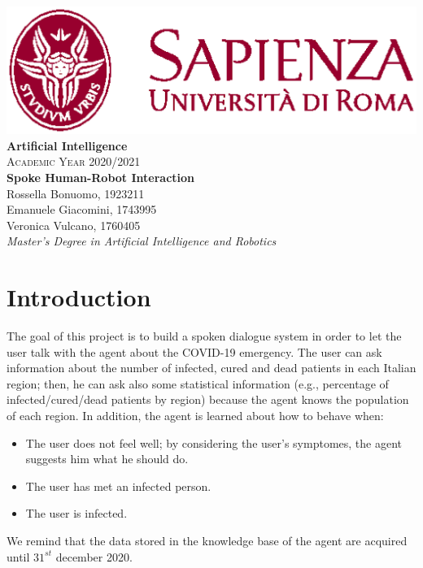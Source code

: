 \documentclass{article}
\title{\textbf{ }}
\date{}
\begin{document}
\begin{titlepage}
    \begin{center}
        \includegraphics[width=0.4 \textwidth] {logo.eps}\\
        \vspace{10 em}
        {\Large \textbf{Artificial Intelligence}}\\
        \vspace{3em}
        {\Large \textsc{Academic Year 2020/2021}}\\
        \vspace{8 em}
        {\huge \textbf{Spoke Human-Robot Interaction}}\\
        \vspace{3 em}
        {\large Rossella Bonuomo, 1923211}\\
        \vspace{1 em}
        {\large Emanuele Giacomini, 1743995}\\
        \vspace{1 em}
        {\large Veronica Vulcano, 1760405}
        \vspace{10 em}\\
        {\Large \textit{Master's Degree in Artificial Intelligence and Robotics}}
    \end{center}
\end{titlepage}

\maketitle
\tableofcontents
\pagebreak

\section{Introduction}
The goal of this project is to build a spoken dialogue system in order to let the user talk with the agent about the COVID-19 emergency. The user can ask information about the number of infected, cured and dead patients in each Italian region; then, he can ask also some statistical information (e.g., percentage of infected/cured/dead patients by region) because the agent knows the population of each region. In addition, the agent is learned about how to behave when:
\begin{itemize}
\item The user does not feel well; by considering the user's symptomes, the agent suggests him what he should do.
\item The user has met an infected person.
\item The user is  infected.
\end{itemize}
We remind that the data stored in the knowledge base of the agent are acquired until $31^{st}$ december 2020.
\end{document}
